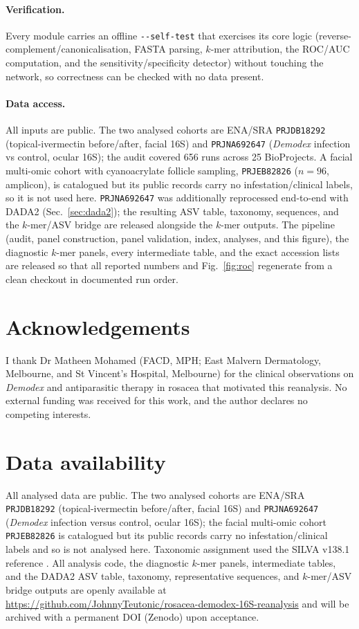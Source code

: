 \documentclass[11pt]{article}
\newcommand{\demodex}{\textit{Demodex}}
\begin{document}
\paragraph{Verification.} Every module carries an offline \texttt{-{}-self-test}
that exercises its core logic (reverse-complement/canonicalisation, FASTA
parsing, $k$-mer attribution, the ROC/AUC computation, and the
sensitivity/specificity detector) without touching the network, so correctness
can be checked with no data present.

\paragraph{Data access.} All inputs are public. The two analysed cohorts are
ENA/SRA \texttt{PRJDB18292} (topical-ivermectin before/after, facial 16S) and
\texttt{PRJNA692647} (\demodex{} infection vs control, ocular 16S); the audit
covered 656 runs across 25 BioProjects. A facial multi-omic cohort with
cyanoacrylate follicle sampling, \texttt{PRJEB82826} ($n=96$, amplicon), is
catalogued but its public records carry no infestation/clinical labels, so it is
not used here. \texttt{PRJNA692647} was additionally reprocessed end-to-end with
DADA2 (Sec.~\ref{sec:dada2}); the resulting ASV table, taxonomy, sequences, and
the $k$-mer/ASV bridge are released alongside the $k$-mer outputs. The pipeline
(audit, panel construction, panel validation, index,
analyses, and this figure), the diagnostic $k$-mer panels, every intermediate
table, and the exact accession lists are released so that all reported numbers
and Fig.~\ref{fig:roc} regenerate from a clean checkout in documented run order.

\section*{Acknowledgements}
I thank Dr Matheen Mohamed (FACD, MPH; East Malvern Dermatology, Melbourne, and
St Vincent's Hospital, Melbourne) for the clinical observations on \demodex{} and
antiparasitic therapy in rosacea that motivated this reanalysis. No external
funding was received for this work, and the author declares no competing
interests.

\section*{Data availability}
All analysed data are public. The two analysed cohorts are ENA/SRA
\texttt{PRJDB18292} (topical-ivermectin before/after, facial 16S) and
\texttt{PRJNA692647} (\demodex{} infection versus control, ocular 16S); the
facial multi-omic cohort \texttt{PRJEB82826} \citep{olah2025} is catalogued but
its public records carry no infestation/clinical labels and so is not analysed
here. Taxonomic assignment used the SILVA v138.1 reference \citep{quast2013}. All
analysis code, the diagnostic $k$-mer panels, intermediate tables, and the DADA2
ASV table, taxonomy, representative sequences, and $k$-mer/ASV bridge outputs are
openly available at
\url{https://github.com/JohnnyTeutonic/rosacea-demodex-16S-reanalysis} and will
be archived with a permanent DOI (Zenodo) upon acceptance.
\end{document}
